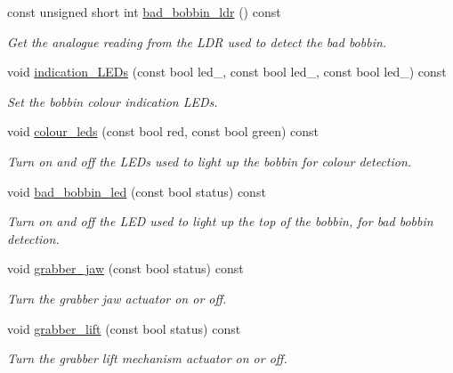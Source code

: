 \begin{DoxyCompactItemize}
const unsigned short int \hyperlink{classIDP_1_1HardwareAbstractionLayer_a152c44415559cfe4e74a5560bbe92105}{bad\_\-bobbin\_\-ldr} () const 
\begin{DoxyCompactList}\small\item\em Get the analogue reading from the LDR used to detect the bad bobbin. \item\end{DoxyCompactList}\item 
void \hyperlink{classIDP_1_1HardwareAbstractionLayer_af776086df3d861a8bec53637c91b84ab}{indication\_\-LEDs} (const bool led\_, const bool led\_, const bool led\_) const 
\begin{DoxyCompactList}\small\item\em Set the bobbin colour indication LEDs. \item\end{DoxyCompactList}\item 
void \hyperlink{classIDP_1_1HardwareAbstractionLayer_a6034826727571aec7d30999d8c88fa80}{colour\_\-leds} (const bool red, const bool green) const 
\begin{DoxyCompactList}\small\item\em Turn on and off the LEDs used to light up the bobbin for colour detection. \item\end{DoxyCompactList}\item 
void \hyperlink{classIDP_1_1HardwareAbstractionLayer_a7e687c2254a9bfba55ff99ce191c27ae}{bad\_\-bobbin\_\-led} (const bool status) const 
\begin{DoxyCompactList}\small\item\em Turn on and off the LED used to light up the top of the bobbin, for bad bobbin detection. \item\end{DoxyCompactList}\item 
void \hyperlink{classIDP_1_1HardwareAbstractionLayer_a577c1794c61814c3b23f5017437aba97}{grabber\_\-jaw} (const bool status) const 
\begin{DoxyCompactList}\small\item\em Turn the grabber jaw actuator on or off. \item\end{DoxyCompactList}\item 
void \hyperlink{classIDP_1_1HardwareAbstractionLayer_a0bf933820024212953433404e981be16}{grabber\_\-lift} (const bool status) const 
\begin{DoxyCompactList}\small\item\em Turn the grabber lift mechanism actuator on or off. \item\end{DoxyCompactList}\end{DoxyCompactItemize}


